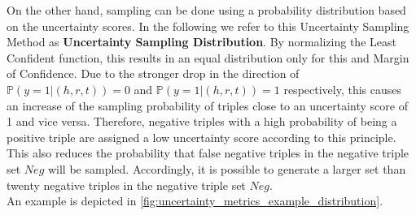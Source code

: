 On the other hand, sampling can be done using a probability distribution based on the uncertainty scores.
In the following we refer to this Uncertainty Sampling Method as \textbf{Uncertainty Sampling Distribution}.
By normalizing the Least Confident function, this results in an equal distribution only for this and Margin of Confidence.    
Due to the stronger drop in the direction of $\mathds{P}(y = 1 | (h,r,t)) = 0$ and $\mathds{P}(y = 1 | (h,r,t)) = 1$ respectively, this causes an increase of the sampling probability of triples close to an uncertainty score of 1 and vice versa.
Therefore, negative triples with a high probability of being a positive triple are assigned a low uncertainty score according to this principle.
This also reduces the probability that false negative triples in the negative triple set $Neg$ will be sampled.
Accordingly, it is possible to generate a larger set than twenty negative triples in the negative triple set $Neg$.\\
An example is depicted in \autoref{fig:uncertainty_metrics_example_distribution}.
